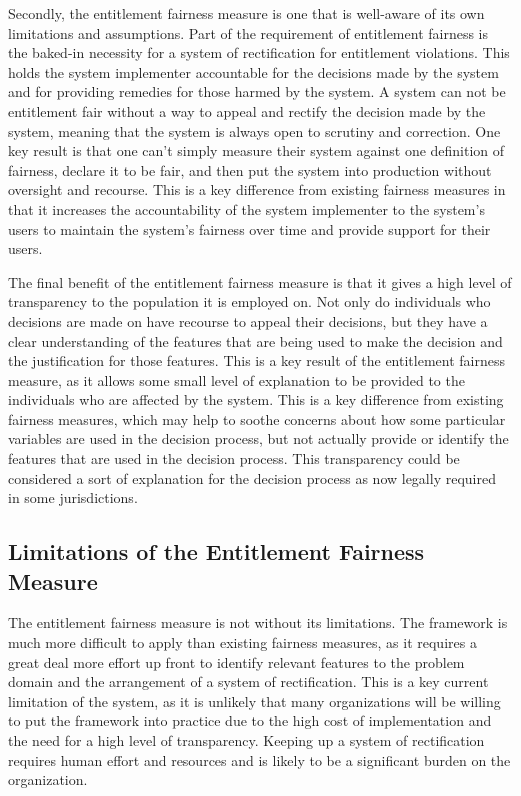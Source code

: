 Secondly, the entitlement fairness measure is one that is well-aware of its own
limitations and assumptions. Part of the requirement of entitlement fairness is
the baked-in necessity for a system of rectification for entitlement violations.
This holds the system implementer accountable for the decisions made by the
system and for providing remedies for those harmed by the system. A system can
not be entitlement fair without a way to appeal and rectify the decision made by
the system, meaning that the system is always open to scrutiny and correction.
One key result is that one can't simply measure their system against one 
definition of fairness, declare it to be fair, and then put the system into
production without oversight and recourse. This is a key difference from 
existing fairness measures in that it increases the accountability of the system
implementer to the system's users to maintain the system's fairness over time
and provide support for their users. 

The final benefit of the entitlement fairness measure is that it gives a high
level of transparency to the population it is employed on. Not only do
individuals who decisions are made on have recourse to appeal their decisions, 
but they have a clear understanding of the features that are being used to make
the decision and the justification for those features. This is a key 
result of the entitlement fairness measure, as it allows some small level of
explanation to be provided to the individuals who are affected by the system.
This is a key difference from existing fairness measures, which may help to
soothe concerns about how some particular variables are used in the decision 
process, but not actually provide or identify the features that are used in the
decision process. This transparency could be considered a sort of explanation
for the decision process as now legally required in some jurisdictions.

\subsection{Limitations of the Entitlement Fairness Measure}

The entitlement fairness measure is not without its limitations. The framework
is much more difficult to apply than existing fairness measures, as it requires
a great deal more effort up front to identify relevant features to the
problem domain and the arrangement of a system of rectification. This is a key
current limitation of the system, as it is unlikely that many organizations
will be willing to put the framework into practice due to the high cost of
implementation and the need for a high level of transparency. Keeping up a
system of rectification requires human effort and resources and is likely to
be a significant burden on the organization.

